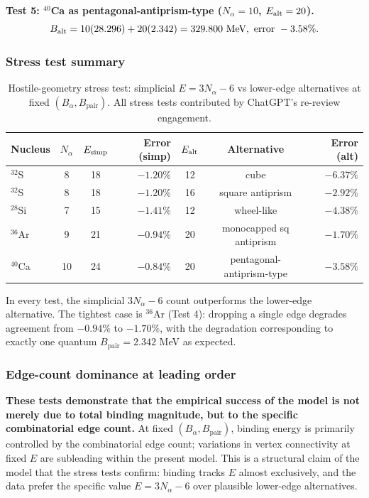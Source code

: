 \documentclass[11pt,letterpaper]{article}
\newcommand{\Bpair}{B_{\mathrm{pair}}}
\newcommand{\Balpha}{B_{\alpha}}
\newcommand{\Nalpha}{N_{\alpha}}
\begin{document}
\textbf{Test 5: ${}^{40}$Ca as pentagonal-antiprism-type ($\Nalpha = 10$, $E_{\rm alt} = 20$).}
\[
B_{\rm alt} = 10(28.296) + 20(2.342) = 329.800 \text{ MeV}, \text{ error } -3.58\%.
\]

\subsubsection{Stress test summary}

\begin{table}[H]
\centering
\caption{Hostile-geometry stress test: simplicial $E = 3\Nalpha - 6$ vs lower-edge alternatives at fixed $(\Balpha, \Bpair)$. All stress tests contributed by ChatGPT's re-review engagement.}
\label{tab:stress_test}
\begin{tabular}{@{}lccrccr@{}}
\toprule
Nucleus & $\Nalpha$ & $E_{\rm simp}$ & Error (simp) & $E_{\rm alt}$ & Alternative & Error (alt) \\
\midrule
${}^{32}$S  & 8  & 18 & $-1.20\%$ & 12 & cube             & $-6.37\%$ \\
${}^{32}$S  & 8  & 18 & $-1.20\%$ & 16 & square antiprism & $-2.92\%$ \\
${}^{28}$Si & 7  & 15 & $-1.41\%$ & 12 & wheel-like       & $-4.38\%$ \\
${}^{36}$Ar & 9  & 21 & $-0.94\%$ & 20 & monocapped sq antiprism & $-1.70\%$ \\
${}^{40}$Ca & 10 & 24 & $-0.84\%$ & 20 & pentagonal-antiprism-type & $-3.58\%$ \\
\bottomrule
\end{tabular}
\end{table}

In every test, the simplicial $3\Nalpha - 6$ count outperforms the lower-edge alternative. The tightest case is ${}^{36}$Ar (Test 4): dropping a single edge degrades agreement from $-0.94\%$ to $-1.70\%$, with the degradation corresponding to exactly one quantum $\Bpair = 2.342$ MeV as expected.

\subsubsection{Edge-count dominance at leading order}

\textbf{These tests demonstrate that the empirical success of the model is not merely due to total binding magnitude, but to the specific combinatorial edge count.} At fixed $(\Balpha, \Bpair)$, binding energy is primarily controlled by the combinatorial edge count; variations in vertex connectivity at fixed $E$ are subleading within the present model. This is a structural claim of the model that the stress tests confirm: binding tracks $E$ almost exclusively, and the data prefer the specific value $E = 3\Nalpha - 6$ over plausible lower-edge alternatives.
\end{document}
